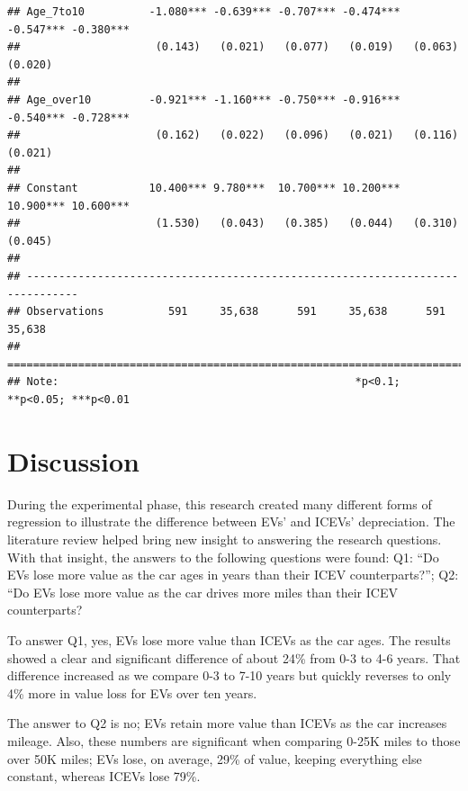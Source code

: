 \documentclass{article}
\begin{document}
\begin{verbatim}
## Age_7to10          -1.080*** -0.639*** -0.707*** -0.474*** -0.547*** -0.380***
##                     (0.143)   (0.021)   (0.077)   (0.019)   (0.063)   (0.020) 
##                                                                               
## Age_over10         -0.921*** -1.160*** -0.750*** -0.916*** -0.540*** -0.728***
##                     (0.162)   (0.022)   (0.096)   (0.021)   (0.116)   (0.021) 
##                                                                               
## Constant           10.400*** 9.780***  10.700*** 10.200*** 10.900*** 10.600***
##                     (1.530)   (0.043)   (0.385)   (0.044)   (0.310)   (0.045) 
##                                                                               
## ------------------------------------------------------------------------------
## Observations          591     35,638      591     35,638      591     35,638  
## ==============================================================================
## Note:                                              *p<0.1; **p<0.05; ***p<0.01
\end{verbatim}

\hypertarget{discussion}{%
\section{Discussion}\label{discussion}}

During the experimental phase, this research created many different
forms of regression to illustrate the difference between EVs' and ICEVs'
depreciation. The literature review helped bring new insight to
answering the research questions. With that insight, the answers to the
following questions were found: Q1: ``Do EVs lose more value as the car
ages in years than their ICEV counterparts?''; Q2: ``Do EVs lose more
value as the car drives more miles than their ICEV counterparts?

To answer Q1, yes, EVs lose more value than ICEVs as the car ages. The
results showed a clear and significant difference of about 24\% from 0-3
to 4-6 years. That difference increased as we compare 0-3 to 7-10 years
but quickly reverses to only 4\% more in value loss for EVs over ten
years.

The answer to Q2 is no; EVs retain more value than ICEVs as the car
increases mileage. Also, these numbers are significant when comparing
0-25K miles to those over 50K miles; EVs lose, on average, 29\% of
value, keeping everything else constant, whereas ICEVs lose 79\%.
\end{document}
